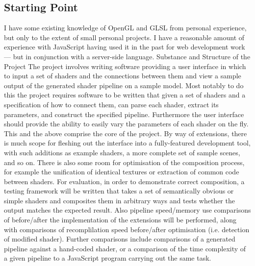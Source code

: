 \subsection*{Starting Point}
I have some existing knowledge of OpenGL and GLSL from personal experience, but only to the
extent of small personal projects. I have a reasonable amount of experience with JavaScript having
used it in the past for web development work --- but in conjunction with a server-side language.
Substance and Structure of the Project
The project involves writing software providing a user interface in which to input a set of shaders
and the connections between them and view a sample output of the generated shader pipeline on a
sample model.
Most notably to do this the project requires software to be written that given a set of shaders and a
specification of how to connect them, can parse each shader, extract its parameters, and construct
the specified pipeline.
Furthermore the user interface should provide the ability to easily vary the parameters of each
shader on the fly. This and the above comprise the core of the project.
By way of extensions, there is much scope for fleshing out the interface into a fully-featured
development tool, with such additions as example shaders, a more complete set of sample scenes,
and so on. There is also some room for optimisation of the composition process, for example the
unification of identical textures or extraction of common code between shaders.
For evaluation, in order to demonstrate correct composition, a testing framework will be written that
takes a set of semantically obvious or simple shaders and composites them in arbitrary ways and
tests whether the output matches the expected result. Also pipeline speed/memory use comparisons
of before/after the implementation of the extensions will be performed, along with comparisons of
recomplilation speed before/after optimisation (i.e. detection of modified shader). Further
comparisons include comparisons of a generated pipeline against a hand-coded shader, or a
comparison of the time complexity of a given pipeline to a JavaScript program carrying out the
same task.


